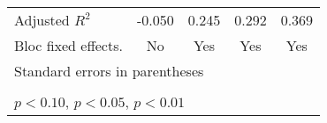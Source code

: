 {\begin{tabular}{l*{4}{c}}
Adjusted \(R^{2}\)  &      -0.050         &       0.245         &       0.292         &       0.369         \\
Bloc fixed effects. &          No         &         Yes         &         Yes         &         Yes         \\
\hline\hline
\multicolumn{5}{l}{\footnotesize Standard errors in parentheses}\\
\multicolumn{5}{l}{\footnotesize }\\
\multicolumn{5}{l}{\footnotesize \sym{*} \(p<0.10\), \sym{**} \(p<0.05\), \sym{***} \(p<0.01\)}\\
\end{tabular}
}

